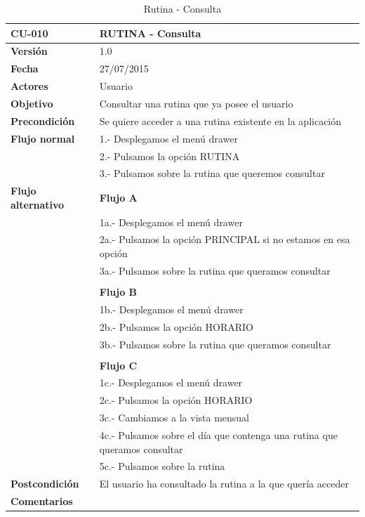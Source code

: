 \documentclass[../pfc.tex]{subfiles}
\begin{document}
		\begin{table}[H]
			\centering
			\begin{tabular}[t]{|p{3cm}|p{9.5cm}|}
				\hline \textbf{CU-010} & \textbf{RUTINA - Consulta} \\*
				\hline\hline \textbf{Versión} & 1.0 \\*
				\hline\hline \textbf{Fecha} & 27/07/2015 \\*
				\hline\textbf{Actores} 	& Usuario\\*
				\hline \textbf{Objetivo} & Consultar una rutina que ya posee el usuario\\* 			
				\hline \textbf{Precondición} & Se quiere acceder a una rutina existente en la aplicación\\* 
				\hline \textbf{Flujo normal} & 1.- Desplegamos el menú drawer \\* 
				& 2.- Pulsamos la opción RUTINA\\*	
				& 3.- Pulsamos sobre la rutina que queremos consultar\\*	
				\hline \textbf{Flujo alternativo} & \textbf{Flujo A} \\* 
				& 1a.- Desplegamos el menú drawer \\* 
				& 2a.- Pulsamos la opción PRINCIPAL si no estamos en esa opción\\*	
				& 3a.- Pulsamos sobre la rutina que queramos consultar\\*	
				& \\*	
				& \textbf{Flujo B} \\* 
				& 1b.- Desplegamos el menú drawer \\* 
				& 2b.- Pulsamos la opción HORARIO\\*	
				& 3b.- Pulsamos sobre la rutina que queramos consultar\\*	
				& \\*	
				& \textbf{Flujo C} \\* 
				& 1c.- Desplegamos el menú drawer \\* 
				& 2c.- Pulsamos la opción HORARIO \\*	
				& 3c.- Cambiamos a la vista mensual \\*	
				& 4c.- Pulsamos sobre el día que contenga una rutina que queramos consultar\\*	
				& 5c.- Pulsamos sobre la rutina\\*		
				\hline \textbf{Postcondición} & El usuario ha consultado la rutina a la que quería acceder \\* 
				\hline \textbf{Comentarios}   & \\*
				\hline
			\end{tabular}
			\caption{Rutina - Consulta}
			\label{tabla:caso010}
		\end{table}
	
\end{document}

